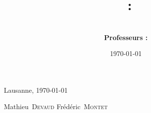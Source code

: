 \documentclass[a4paper, 11pt]{report}
\title{
  \textbf{\mCourse\ :} \mTitle
  \vspace{0.3cm} \\
  \mReportTitle
}
\author{
  \mAuthors
  \vspace{1cm} \\
  \textbf{Professeurs :} \mClassInstructor
}
\date{\today}
\newcommand{\mAuthorOneFN}{Mathieu}
\newcommand{\mAuthorOneLN}{Devaud}
\newcommand{\mAuthorTwoFN}{Frédéric}
\newcommand{\mAuthorTwoLN}{Montet}
\newcommand{\mLocation}{Lausanne} %
\begin{document}

\maketitle



\newpage
\tableofcontents
\newpage










\vspace{3cm}
\mLocation, \today
\vspace{1.5cm} \\

\begin{center}
  \mAuthorOneFN\ \textsc{\mAuthorOneLN}
  \hspace{5cm}
  \mAuthorTwoFN\ \textsc{\mAuthorTwoLN}
\end{center}




%
%



\appendix %

\end{document}
